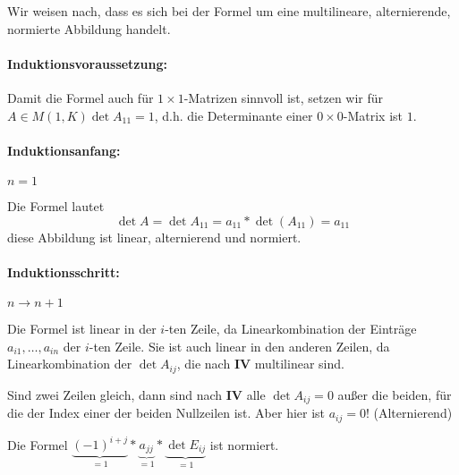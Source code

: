 \beweis
Wir weisen nach, dass es sich bei der Formel um eine multilineare, alternierende, normierte Abbildung handelt.

\paragraph{Induktionsvoraussetzung:}
Damit die Formel auch für $1\times 1 $-Matrizen sinnvoll ist, setzen wir für $A\in M(1,K) \det A_{11}=1$, d.h. die Determinante einer $0\times 0$-Matrix ist $1$.

\paragraph{Induktionsanfang: } $n=1$

Die Formel lautet
\begin{equation*}
	\det A=\det A_{11}=a_{11}*\det(A_{11})=a_{11}
\end{equation*}
diese Abbildung ist linear, alternierend und normiert.


\paragraph{Induktionsschritt: } $n\rightarrow n+1$

Die Formel ist linear in der $i$-ten Zeile, da Linearkombination der Einträge $a_{i1},\ldots,a_{in}$ der $i$-ten Zeile.
Sie ist auch linear in den anderen Zeilen, da Linearkombination der $\det A_{ij}$, die nach \textbf{IV} multilinear sind.

Sind zwei Zeilen gleich, dann sind nach \textbf{IV} alle $\det A_{ij}=0$ außer die beiden, für die der Index einer der beiden Nullzeilen ist. Aber hier ist $a_{ij}=0$! (Alternierend)

Die Formel $\underbrace{(-1)^{i+j}}_{=1}*\underbrace{a_{jj}}_{=1}*\underbrace{\det E_{ij}}_{=1}$ ist normiert.
